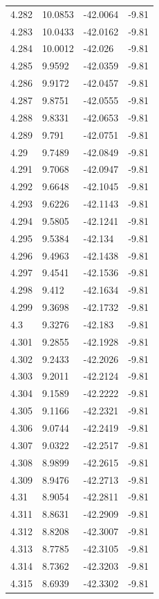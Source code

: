 \begin{tabular}{llll}
4.282 & 10.0853 & -42.0064 & -9.81 \\
4.283 & 10.0433 & -42.0162 & -9.81 \\
4.284 & 10.0012 & -42.026 & -9.81 \\
4.285 & 9.9592 & -42.0359 & -9.81 \\
4.286 & 9.9172 & -42.0457 & -9.81 \\
4.287 & 9.8751 & -42.0555 & -9.81 \\
4.288 & 9.8331 & -42.0653 & -9.81 \\
4.289 & 9.791 & -42.0751 & -9.81 \\
4.29 & 9.7489 & -42.0849 & -9.81 \\
4.291 & 9.7068 & -42.0947 & -9.81 \\
4.292 & 9.6648 & -42.1045 & -9.81 \\
4.293 & 9.6226 & -42.1143 & -9.81 \\
4.294 & 9.5805 & -42.1241 & -9.81 \\
4.295 & 9.5384 & -42.134 & -9.81 \\
4.296 & 9.4963 & -42.1438 & -9.81 \\
4.297 & 9.4541 & -42.1536 & -9.81 \\
4.298 & 9.412 & -42.1634 & -9.81 \\
4.299 & 9.3698 & -42.1732 & -9.81 \\
4.3 & 9.3276 & -42.183 & -9.81 \\
4.301 & 9.2855 & -42.1928 & -9.81 \\
4.302 & 9.2433 & -42.2026 & -9.81 \\
4.303 & 9.2011 & -42.2124 & -9.81 \\
4.304 & 9.1589 & -42.2222 & -9.81 \\
4.305 & 9.1166 & -42.2321 & -9.81 \\
4.306 & 9.0744 & -42.2419 & -9.81 \\
4.307 & 9.0322 & -42.2517 & -9.81 \\
4.308 & 8.9899 & -42.2615 & -9.81 \\
4.309 & 8.9476 & -42.2713 & -9.81 \\
4.31 & 8.9054 & -42.2811 & -9.81 \\
4.311 & 8.8631 & -42.2909 & -9.81 \\
4.312 & 8.8208 & -42.3007 & -9.81 \\
4.313 & 8.7785 & -42.3105 & -9.81 \\
4.314 & 8.7362 & -42.3203 & -9.81 \\
4.315 & 8.6939 & -42.3302 & -9.81 \\

\end{tabular}
